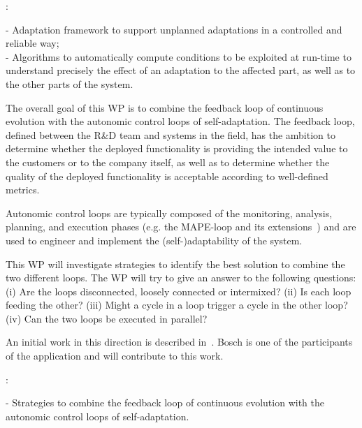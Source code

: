 \documentclass[12pt]{article}
\begin{document}
:
  

 - Adaptation framework to support unplanned adaptations in a controlled and reliable way;\\
 - Algorithms to automatically compute conditions to be exploited at run-time to understand precisely the effect of an adaptation to the affected part, as well as to the other parts of the system.

\vspace{.2cm}

\noindent The overall goal of this WP is to combine the feedback loop of continuous evolution with the autonomic control loops of self-adaptation.
The feedback loop, defined  between the R\&D team and systems in the field, has the ambition to determine whether the
deployed functionality is providing the intended value to the
customers or to the company itself, as well as to determine whether the quality of the deployed functionality is acceptable according to well-defined metrics.

Autonomic control loops are typically composed of the monitoring, analysis, planning, and execution phases (e.g. the MAPE-loop and its extensions~\cite{MARTAssurance}) and are used to engineer and implement the (self-)adaptability of the system. 

This WP will investigate strategies to identify the best solution to combine the two different loops. The WP will try to give an answer to the following questions:
(i) Are the loops disconnected, loosely connected or intermixed? 
(ii) Is each loop feeding the other?
(iii) Might a cycle in a loop trigger a cycle in the other loop? 
(iv) Can the two loops be executed in parallel?

An initial work in this direction is described in~\cite{Bosch2016}. Bosch is one of the participants of the application and will contribute to this work.

:
 
 - Strategies to combine the feedback loop of continuous evolution with the autonomic control loops of self-adaptation.

%
%
%
%
% 
\end{document}
